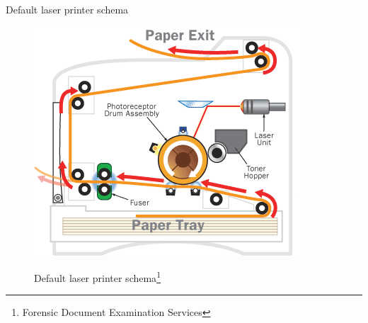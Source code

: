 \documentclass[notes]{beamer}
\begin{document}
\begin{frame}

\begin{block}{Default laser printer schema}

\begin{figure}[!htb]
\centering
\includegraphics[scale=0.4]{page_printer}
\label{fig:page_printer}
\caption{Default laser printer schema\footnote{Forensic Document Examination Services\cite{Page_printer}}}
\end{figure}

\end{block}
{\let\thefootnote\relax\footnotetext{}}
\end{frame}
\end{document}
